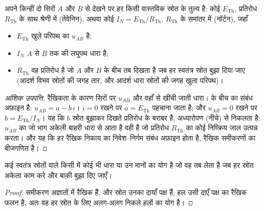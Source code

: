\begin{theorem}[तेवेनिन और नॉर्टन]\label{thm:b1:dc-circuits:thevenin}
अपने किन्हीं दो सिरों $A$ और $B$ से देखने पर हर  किसी वास्तविक
स्रोत के तुल्य है: कोई  $E_{\mathrm{Th}}$, प्रतिरोध
$R_{\mathrm{Th}}$ के साथ श्रेणी में (तेवेनिन), अथवा कोई 
$I_N =
E_{\mathrm{Th}}/R_{\mathrm{Th}}$, $R_{\mathrm{Th}}$ के समांतर में (नॉर्टन), जहाँ
\begin{itemize}
  \item $E_{\mathrm{Th}}$ खुले परिपथ का  $u_{AB}$ है;
  \item $I_N$ $A$ से $B$ तक की लघुपथ धारा है;
  \item $R_{\mathrm{Th}}$ वह प्रतिरोध है जो $A$ और $B$ के बीच तब दिखता है
        जब हर स्वतंत्र स्रोत बुझा दिया जाए (आदर्श विभव स्रोतों की जगह तार,
        और आदर्श धारा स्रोतों की जगह खुला परिपथ)।
\end{itemize}
\end{theorem}

\begin{proof}[आंशिक उपपत्ति]
रैखिकता के कारण सिरों पर  $u_{AB}$ और वहाँ से खींची जाती धारा
$i$ के बीच का संबंध अफ़ाइन है: $u_{AB} = a - b\,i$।
$i = 0$ रखने पर $a = E_{\mathrm{Th}}$ पहचाना जाता है; और $u_{AB} = 0$ रखने पर
$b = E_{\mathrm{Th}}/I_N$। यह कि $b$ स्रोत बुझाकर दिखते प्रतिरोध के बराबर है,
अध्यारोपण (नीचे) से निकलता है: $u_{AB}$ का जो भाग अकेली बाहरी धारा से आता है
वही है जो प्रतिरोध $R_{\mathrm{Th}}$ का कोई निष्क्रिय जाल उत्पन्न करता। और यह
कि हर रैखिक निकाय का निवेश--निर्गम संबंध अफ़ाइन होता है, रैखिक समीकरणों का
बीजगणित है।
\end{proof}

\begin{theorem}[अध्यारोपण]\label{thm:b1:dc-circuits:superposition}
कई स्वतंत्र स्रोतों वाले किसी  में कोई भी धारा या  उन
मानों का योग है जो वह तब लेता है जब हर स्रोत अकेला काम करे और बाक़ी बुझा दिए
जाएँ।
\end{theorem}

\begin{proof}
समीकरण अज्ञातों में रैखिक हैं, और स्रोत उनका दायाँ पक्ष हैं; हल उसी दाएँ पक्ष
का रैखिक फलन है, अतः वह हर स्रोत के लिए अलग-अलग निकले हलों का योग है।
\end{proof}

